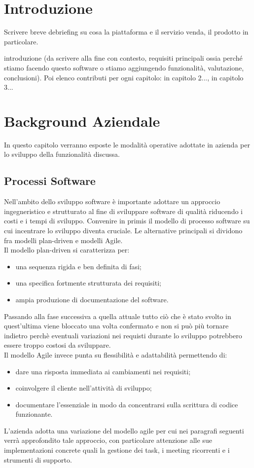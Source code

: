 \documentclass[target=bach,aauheader=,style=]{thud}
\begin{document}
\chapter{Introduzione}

Scrivere breve debriefing su cosa la piattaforma e il servizio venda, il prodotto in particolare.

introduzione (da scrivere alla fine con contesto, requisiti principali ossia perché stiamo facendo questo software o
stiamo aggiungendo funzionalità, valutazione, conclusioni). Poi elenco contributi per ogni capitolo:
in capitolo 2..., in capitolo 3...


\chapter{Background Aziendale}

In questo capitolo verranno esposte le modalità operative adottate in azienda per lo sviluppo della funzionalità discussa.

\section{Processi Software}

Nell'ambito dello sviluppo software è importante adottare un approccio ingegneristico e strutturato al fine di sviluppare software di
qualità riducendo i costi e i tempi di sviluppo. Convenire in primis il modello di processo software su cui incentrare lo
sviluppo diventa cruciale. Le alternative principali si dividono fra modelli plan-driven e modelli Agile.\\
Il modello plan-driven si caratterizza per:
\begin{itemize}
    \item una sequenza rigida e ben definita di fasi;
    \item una specifica fortmente strutturata dei requisiti;
    \item ampia produzione di documentazione del software.
\end{itemize}
Passando alla fase successiva a quella attuale tutto ciò che è stato svolto in quest'ultima viene bloccato una volta confermato
e non si può più tornare indietro perchè eventuali variazioni nei requisti durante lo sviluppo potrebbero essere troppo costosi
da sviluppare.\\ Il modello Agile invece punta su flessibilità e adattabilità permettendo di:
\begin{itemize}
    \item dare una risposta immediata ai cambiamenti nei requisiti;
    \item coinvolgere il cliente nell'attività di sviluppo;
    \item documentare l'essenziale in modo da concentrarsi sulla scrittura di codice funzionante.
\end{itemize}
L'azienda adotta una variazione del modello agile per cui nei paragrafi seguenti verrà approfondito tale approccio,
con particolare attenzione alle sue implementazioni concrete quali la gestione dei task, i meeting ricorrenti e i strumenti
di supporto.
\end{document}
